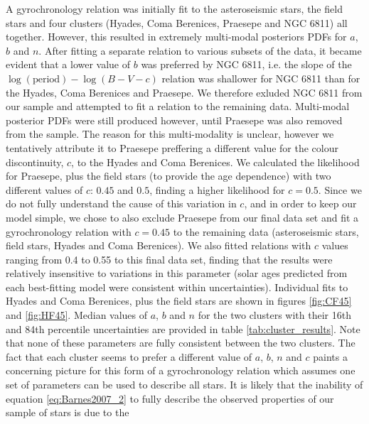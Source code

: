 \documentclass[useAMS, usenatbib]{mn2e}
\begin{document}
A gyrochronology relation was initially fit to the asteroseismic stars, the
field stars and four clusters (Hyades, Coma Berenices, Praesepe and NGC 6811)
all together.
However, this resulted in extremely multi-modal posteriors PDFs for
$a$, $b$ and $n$.
After fitting a separate relation to various subsets of the data, it became
evident that a lower value of $b$ was preferred by NGC 6811,
i.e. the slope of the $\log(\mathrm{period})-\log(B-V-c)$ relation was
shallower for NGC 6811 than for the Hyades, Coma Berenices and Praesepe.
We therefore exluded NGC 6811 from our sample and attempted to fit
a relation to the remaining data.
Multi-modal posterior PDFs were still produced however, until Praesepe was
also removed from the sample.
The reason for this multi-modality is unclear, however we tentatively attribute
it to Praesepe preffering a different value for the colour discontinuity, $c$,
to the Hyades and Coma Berenices.  %
We calculated the likelihood for Praesepe, plus the field stars (to provide
the age dependence) with two different values of $c$: $0.45$ and $0.5$,
finding a higher likelihood for $c=0.5$.
Since we do not fully understand the cause of this variation in $c$, and in
order to keep our model simple, we chose to also exclude Praesepe from
our final data set and fit a gyrochronology relation with $c=0.45$ to the
remaining data (asteroseismic stars, field stars, Hyades and Coma Berenices).
We also fitted relations with $c$ values ranging from 0.4 to 0.55 to this final
data set, finding that the results were relatively insensitive to variations
in this parameter (solar ages predicted from each best-fitting model were
consistent within uncertainties).
Individual fits to Hyades and Coma Berenices, plus the field stars are shown
in figures \ref{fig:CF45} and \ref{fig:HF45}.
Median values of $a$, $b$ and $n$ for the two clusters with their 16th and 84th
percentile uncertainties are provided in table
\ref{tab:cluster_results}.
Note that none of these parameters are fully consistent between the two
clusters.
The fact that each cluster seems to prefer a different value of $a$, $b$, $n$
and $c$ paints a concerning picture for this form of a gyrochronology relation
which assumes one set of parameters can be used to describe all stars.
It is likely that the inability of equation \ref{eq:Barnes2007_2} to fully
describe the observed properties of our sample of stars is due to the
\end{document}
